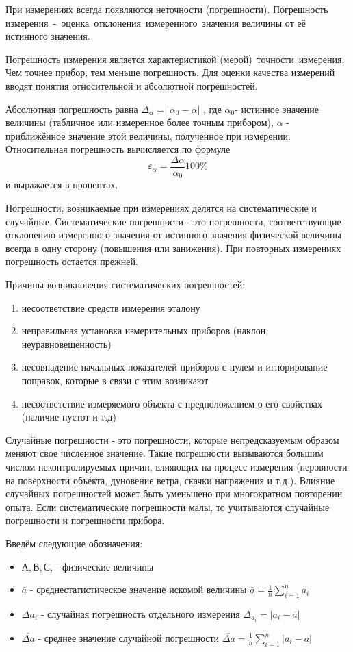 \documentclass[a6paper, 11pt]{diss_4}
\renewcommand{\'}{\,'}
\begin{document}
 При измерениях всегда появляются неточности (погрешности). Погрешность
измерения - оценка отклонения измеренного значения величины от её истинного
значения.

 Погрешность измерения является характеристикой (мерой) точности измерения.
Чем точнее прибор, тем меньше погрешность. Для оценки качества измерений
вводят понятия относительной и абсолютной погрешностей.

  Абсолютная погрешность равна $\Delta_\alpha=|\alpha_0-\alpha|$ , где
$\alpha_0$- истинное значение величины (табличное или измеренное более точным
прибором), $\alpha$ - приближённое значение этой величины, полученное при
измерении. Относительная погрешность вычисляется по формуле
\[\varepsilon_\alpha=\frac{\Delta\alpha}{\alpha_0}100\%\] и выражается в
процентах.

  Погрешности, возникаемые при измерениях делятся на систематические и
случайные. Систематические погрешности - это погрешности, соответствующие
отклонению измеренного значения от истинного значения физической величины
всегда в одну сторону (повышения или занижения). При повторных измерениях
погрешность остается прежней.

Причины возникновения систематических погрешностей:
\begin{enumerate}
  \item несоответствие средств измерения эталону
  \item неправильная установка измерительных приборов (наклон, неуравновешенность)
  \item несовпадение начальных показателей приборов с нулем и игнорирование поправок, которые в связи с этим возникают
  \item несоответствие измеряемого объекта с предположением о его свойствах (наличие пустот и т.д)
\end{enumerate}

  Случайные погрешности - это погрешности, которые непредсказуемым образом
меняют свое численное значение. Такие погрешности вызываются большим числом
неконтролируемых причин, влияющих на процесс измерения (неровности на
поверхности объекта, дуновение ветра, скачки напряжения и т.д.). Влияние
случайных погрешностей может быть уменьшено при многократном повторении
опыта. Если систематические погрешности малы, то учитываются случайные
погрешности и погрешности прибора.

   Введём следующие обозначения:

\begin{itemize}
  \item{ $А, В, С$, - физические величины
  }
  \item{ $\bar{a}$ - среднестатистическое значение искомой величины
  $\bar{a}=\frac{1}{n}\sum\limits_{i=1}^{n}a_i$
  }
  \item{ $\Delta a_i$ - случайная погрешность отдельного измерения
  $\Delta_{a_i}=|a_i-\bar{a}|$
  }
  \item{ $\overline{\Delta a}$ - среднее значение случайной погрешности
  $\overline{\Delta a}=\frac{1}{n}\sum\limits_{i=1}^{n}|a_i-\bar{a}|$
  }
\end{itemize}
\end{document}
